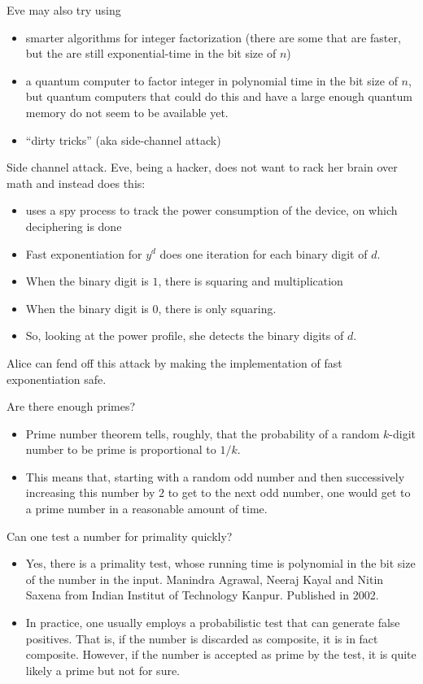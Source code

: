 \documentclass{beamer}
\begin{document}
\begin{frame}
	Eve may also try using 
	\pause 
	\begin{itemize}[<+->] 
		\item  smarter algorithms for integer factorization (there are some that are faster, but the are still exponential-time in the bit size of $n$)
		\item a quantum computer to factor integer in polynomial time in the bit size of $n$, but quantum computers that could do this  and have a large enough quantum memory do not seem to be available yet. 
		\item ``dirty tricks'' (aka side-channel attack)
	\end{itemize} 
\end{frame} 

\begin{frame}
	Side channel attack. Eve, being a hacker, does not want to rack her brain over math and instead does this: 
	\pause 
	\begin{itemize}[<+->]
		\item uses a spy process to track the power consumption of the device, on which deciphering is done 
		\item Fast exponentiation for $y^d$ does one iteration for each binary digit of $d$. 
		\item When the binary digit is $1$, there is squaring and multiplication
		\item When the binary digit is $0$, there is only squaring. 
		\item So, looking at the power profile, she detects the binary digits of $d$. 
	\end{itemize} 
	\pause
	Alice can fend off this attack by making the implementation of fast exponentiation safe. 
\end{frame} 

\begin{frame} 
	Are there enough primes? 
	\begin{itemize}[<+->]
		\item  Prime number theorem tells, roughly, that the probability of a random $k$-digit number to be prime is proportional to $1/k$. 
		\item This means that, starting with a random odd number and then successively increasing this number by $2$ to get to the next odd number, one would get to a prime number in a reasonable amount of time. 
	\end{itemize}
	\pause 
	Can one test a number for primality quickly? 
	\begin{itemize}[<+->]
		\item Yes, there is a primality test, whose running time is polynomial in the bit size of the number in the input. Manindra Agrawal, Neeraj Kayal and Nitin Saxena from Indian Institut of Technology Kanpur. Published in 2002. 
		\item In practice, one usually employs a probabilistic test that can generate false positives. That is, if the number is discarded as composite, it is in fact composite. However, if the number is accepted as prime by the test, it is quite likely a prime but not for sure. 
	\end{itemize} 
\end{frame} 
\end{document}
